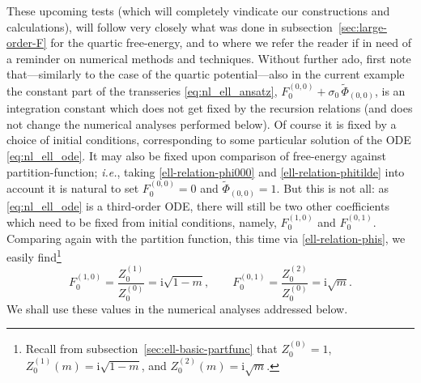 \documentclass[11pt,a4paper]{article}
\newcommand{\be}{\begin{equation}}
\newcommand{\ee}{\end{equation}}
\begin{document}
These upcoming tests (which will completely vindicate our constructions and calculations), will follow very closely what was done in subsection~\ref{sec:large-order-F} for the quartic free-energy, and to where we refer the reader if in need of a reminder on numerical methods and techniques. Without further ado, first note that---similarly to the case of the quartic potential---also in the current example the constant part of the transseries \eqref{eq:nl_ell_ansatz}, $F_0^{(0,0)} + \sigma_0\, \widetilde{\Phi}_{(0,0)}$, is an integration constant which does not get fixed by the recursion relations (and does not change the numerical analyses performed below). Of course it is fixed by a choice of initial conditions, corresponding to some particular solution of the ODE \eqref{eq:nl_ell_ode}. It may also be fixed upon comparison of free-energy against partition-function; \textit{i.e.}, taking \eqref{ell-relation-phi000} and \eqref{ell-relation-phitilde} into account it is natural to set $F_0^{(0,0)}=0$ and $\widetilde{\Phi}_{(0,0)}=1$. But this is not all: as \eqref{eq:nl_ell_ode} is a third-order ODE, there will still be two other coefficients which need to be fixed from initial conditions, namely, $F_0^{(1,0)}$ and $F_0^{(0,1)}$. Comparing again with the partition function, this time via \eqref{ell-relation-phis}, we easily find\footnote{Recall from subsection~\ref{sec:ell-basic-partfunc} that $Z_0^{(0)}=1$, $Z_0^{(1)}(m)=\mathrm{i}\sqrt{1-m}$, and  $Z_0^{(2)}(m)=\mathrm{i}\sqrt{m}$.}
%
\be
F_0^{(1,0)} = \frac{Z_0^{(1)}}{Z_0^{(0)}} = \mathrm{i}\sqrt{1-m}, \qquad F_0^{(0,1)} = \frac{Z_0^{(2)}}{Z_0^{(0)}} = \mathrm{i}\sqrt{m}.
\ee
%
\noindent
We shall use these values in the numerical analyses addressed below.
\end{document}
